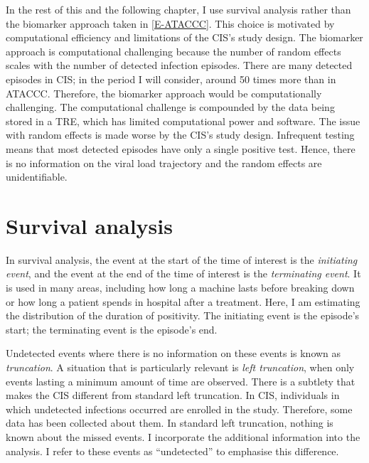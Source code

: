 \documentclass[thesis.tex]{subfiles}
\begin{document}
In the rest of this and the following chapter, I use survival analysis rather than the biomarker approach taken in \cref{E-ATACCC}.
This choice is motivated by computational efficiency and limitations of the CIS's study design.
The biomarker approach is computational challenging because the number of random effects scales with the number of detected infection episodes.
There are many detected episodes in CIS; in the period I will consider, around 50 times more than in ATACCC.
Therefore, the biomarker approach would be computationally challenging.
The computational challenge is compounded by the data being stored in a TRE, which has limited computational power and software.
The issue with random effects is made worse by the CIS's study design.
Infrequent testing means that most detected episodes have only a single positive test.
Hence, there is no information on the viral load trajectory and the random effects are unidentifiable.

\section{Survival analysis}

In survival analysis, the event at the start of the time of interest is the \emph{initiating event}, and the event at the end of the time of interest is the \emph{terminating event}.
It is used in many areas, including how long a machine lasts before breaking down or how long a patient spends in hospital after a treatment.
Here, I am estimating the distribution of the duration of positivity.
The initiating event is the episode's start; the terminating event is the episode's end.

Undetected events where there is no information on these events is known as \emph{truncation}.
A situation that is particularly relevant is \emph{left truncation}, when only events lasting a minimum amount of time are observed.
There is a subtlety that makes the CIS different from standard left truncation.
In CIS, individuals in which undetected infections occurred are enrolled in the study.
Therefore, some data has been collected about them.
In standard left truncation, nothing is known about the missed events.
I incorporate the additional information into the analysis.
I refer to these events as ``undetected'' to emphasise this difference.
\end{document}
